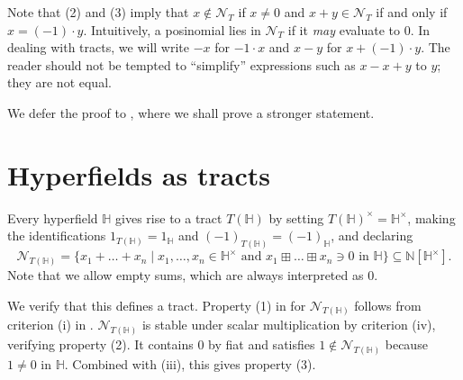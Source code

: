 \documentclass[reqno]{amsart}
\newtheorem{Prop}[Thm]{Proposition}
\theoremstyle{definition}
\theoremstyle{remark}
\newtheorem{Rmk}[Thm]{Remark}
\newcommand{\abs}[1]{\lvert #1 \rvert}
\newcommand{\Nc}{\mathcal{N}}
\begin{document}
    Note that (2) and (3) imply that $x \notin \Nc_T$ if $x \neq 0$ and $x + y \in \mathcal{N}_T$ if and only if 
    $x = (-1) \cdot y$. Intuitively, a posinomial  lies in $\Nc_T$ if it \emph{may} evaluate to 0.
    In dealing with tracts, we will write 
    $-x$ for $-1 \cdot x$ and 
    $x - y$ for $x + (-1) \cdot y$.
    The reader should not be tempted to ``simplify'' expressions such as $x - x + y$ to $y$; they are not equal.
    We defer the proof to , where we shall prove a stronger statement.

    \section{Hyperfields as tracts}\label{sec:H_as_T}

    Every hyperfield $\mathbb{H}$ gives rise to a tract $T(\mathbb{H})$ by setting $T(\mathbb{H})^{\times} = \mathbb{H}^{\times}$, making the identifications $1_{T(\mathbb{H})} = 1_{\mathbb{H}}$ and 
    $(-1)_{T(\mathbb{H})} = (-1)_{\mathbb{H}}$, and declaring
    \[
        \mathcal{N}_{T(\mathbb{H})} = \{ x_1 + \dots + x_n \mid \text{$x_1, \dots, x_n \in \mathbb{H}^{\times}$ and $x_1 \boxplus \dots \boxplus x_n \ni 0$ in $\mathbb{H}$}\} \subseteq \mathbb{N}[\mathbb{H}^{\times}].
    \]
    Note that we allow empty sums, which are always interpreted as $0$.

    We verify that this defines a tract.
    Property (1) in  for $\mathcal{N}_{T(\mathbb{H})}$ follows from criterion (i) in . $\mathcal{N}_{T(\mathbb{H})}$ 
    is stable under scalar multiplication by criterion (iv), verifying property (2). It contains $0$ by fiat and satisfies $1 \notin \Nc_{T(\mathbb{H})}$ because $1 \neq 0$ in $\mathbb{H}$. Combined with (iii), this gives
    property (3).
\end{document}
